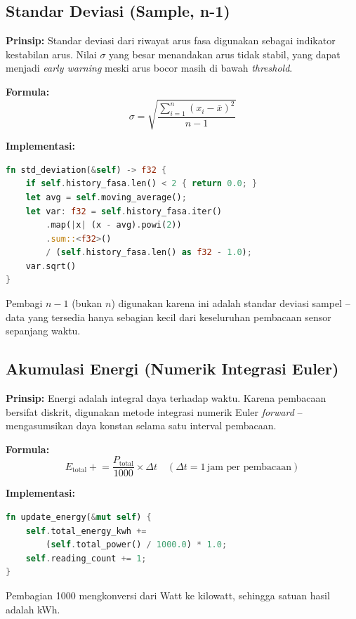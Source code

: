 \documentclass[12pt,a4paper]{article}
\begin{document}
\subsection{Standar Deviasi (Sample, n-1)}

\textbf{Prinsip:} Standar deviasi dari riwayat arus fasa digunakan sebagai
indikator kestabilan arus. Nilai $\sigma$ yang besar menandakan arus tidak
stabil, yang dapat menjadi \emph{early warning} meski arus bocor masih di bawah
\emph{threshold}.

\textbf{Formula:}
\[
    \sigma = \sqrt{\frac{\sum_{i=1}^{n}(x_i - \bar{x})^2}{n-1}}
\]

\textbf{Implementasi:}
\begin{lstlisting}[language=Rust, caption={Fungsi std\_deviation}]
fn std_deviation(&self) -> f32 {
    if self.history_fasa.len() < 2 { return 0.0; }
    let avg = self.moving_average();
    let var: f32 = self.history_fasa.iter()
        .map(|x| (x - avg).powi(2))
        .sum::<f32>()
        / (self.history_fasa.len() as f32 - 1.0);
    var.sqrt()
}
\end{lstlisting}

Pembagi $n-1$ (bukan $n$) digunakan karena ini adalah standar deviasi sampel --
data yang tersedia hanya sebagian kecil dari keseluruhan pembacaan sensor
sepanjang waktu.

\subsection{Akumulasi Energi (Numerik Integrasi Euler)}

\textbf{Prinsip:} Energi adalah integral daya terhadap waktu. Karena pembacaan
bersifat diskrit, digunakan metode integrasi numerik Euler \emph{forward} --
mengasumsikan daya konstan selama satu interval pembacaan.

\textbf{Formula:}
\[
    E_{\text{total}} \mathrel{+}= \frac{P_{\text{total}}}{1000} \times \Delta t
    \quad (\Delta t = 1\,\text{jam per pembacaan})
\]

\textbf{Implementasi:}
\begin{lstlisting}[language=Rust, caption={Fungsi update\_energy}]
fn update_energy(&mut self) {
    self.total_energy_kwh +=
        (self.total_power() / 1000.0) * 1.0;
    self.reading_count += 1;
}
\end{lstlisting}

Pembagian 1000 mengkonversi dari Watt ke kilowatt, sehingga satuan hasil adalah
kWh.

\end{document}
